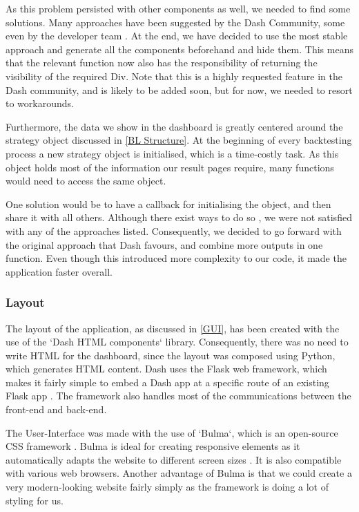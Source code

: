 As this problem persisted with other components as well, we needed to find some solutions. Many approaches have been suggested by the Dash Community, some even by the developer team \cite{dash_workaround}. At the end, we have decided to use the most stable approach and generate all the components beforehand and hide them. This means that the relevant function now also has the responsibility of returning the visibility of the required Div. Note that this is a highly requested feature in the Dash community, and is likely to be added soon, but for now, we needed to resort to workarounds.

Furthermore, the data we show in the dashboard is greatly centered around the strategy object discussed in \ref{BL Structure}. At the beginning of every backtesting process a new strategy object is initialised, which is a time-costly task. As this object holds most of the information our result pages require, many functions would need to access the same object. 

One solution would be to have a callback for initialising the object, and then share it with all others. Although there exist ways to do so \cite{dash_share}, we were not satisfied with any of the approaches listed. Consequently, we decided to go forward with the original approach that Dash favours, and combine more outputs in one function. Even though this introduced more complexity to our code, it made the application faster overall.

\subsubsection*{Layout}

The layout of the application, as discussed in \ref{GUI}, has been created with the use of the `Dash HTML components` library. Consequently, there was no need to write HTML for the dashboard, since the layout was composed using Python, which generates HTML content. Dash uses the Flask web framework, which makes it fairly simple to embed a Dash app at a specific route of an existing Flask app \cite{flask-dash}. The framework also handles most of the communications between the front-end and back-end.

The User-Interface was made with the use of `Bulma`, which is an open-source CSS framework \cite{bulma}. Bulma is ideal for creating responsive elements as it automatically adapts the website to different screen sizes \cite{responsiveness_2020}. It is also compatible with various web browsers. Another advantage of Bulma is that we could create a very modern-looking website fairly simply as the framework is doing a lot of styling for us.

